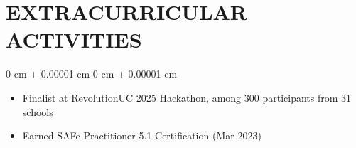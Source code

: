 \documentclass[9pt, letterpaper]{article}
\newenvironment{highlights}{
    \begin{itemize}[
        topsep=0.05 cm,
        parsep=0 pt,
        partopsep=0pt,
        itemsep=0pt,
        leftmargin=10pt
    ]
}{
    \end{itemize}
} %
\newenvironment{onecolentry}{
    \begin{adjustwidth}{
        0 cm + 0.00001 cm}{
        0 cm + 0.00001 cm}
}{
    \end{adjustwidth}
} %
\begin{document}
\section{EXTRACURRICULAR ACTIVITIES}

    \begin{onecolentry}
        \begin{highlights}
            \item Finalist at RevolutionUC 2025 Hackathon, among 300 participants from 31 schools
            \item Earned SAFe Practitioner 5.1 Certification (Mar 2023)
        \end{highlights}
    \end{onecolentry}
\end{document}
